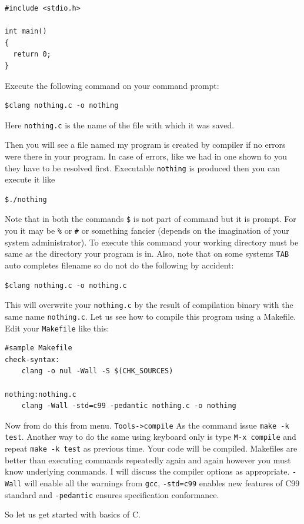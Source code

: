 \begin{verbatim}
#include <stdio.h>

int main()
{
  return 0;
}
\end{verbatim}

Execute the following command on your command prompt:

\begin{verbatim}
$clang nothing.c -o nothing
\end{verbatim}
Here \texttt{nothing.c} is the name of the file with which it was saved.

Then you will see a file named my program is created by compiler if no errors
were there in your program. In case of errors, like we had in one shown to you
they have to be resolved first. Executable \texttt{nothing} is produced then
you can execute it like

\begin{verbatim}
$./nothing
\end{verbatim}

Note that in both the commands \texttt{\$} is not part of command but it is
prompt. For you it may be \texttt{\%} or \texttt{\#} or something fancier
(depends on the imagination of your system administrator). To execute this
command your working directory must be same as the directory your program is
in. Also, note that on some systems \texttt{TAB} auto completes filename so do
not do the following by accident:

\color{nicered}
\begin{verbatim}
$clang nothing.c -o nothing.c
\end{verbatim}
\color{black}
This will overwrite your \texttt{nothing.c} by the result of compilation binary
with the same name \texttt{nothing.c}. Let us see how to compile this program
using a Makefile. Edit your \texttt{Makefile} like this:

\begin{verbatim}
#sample Makefile
check-syntax:
    clang -o nul -Wall -S $(CHK_SOURCES)

nothing:nothing.c
    clang -Wall -std=c99 -pedantic nothing.c -o nothing
\end{verbatim}

Now from do this from menu. \texttt{Tools->compile} As the command issue
\texttt{make -k test}. Another way to do the same using keyboard only is type
\texttt{M-x compile} and repeat \texttt{make -k test} as previous time. Your
code will be compiled. Makefiles are better than executing commands 
repeatedly again and again however you must know underlying commands. I will
discuss the compiler options as appropriate. \texttt{-Wall} will enable all the
warnings from \texttt{gcc}, \texttt{-std=c99} enables new features of C99
standard and \texttt{-pedantic} ensures specification conformance. 

So let us get started with basics of C.